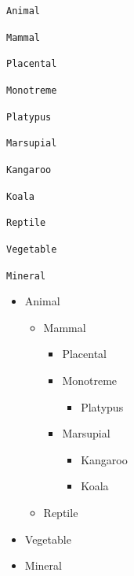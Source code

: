 \begin{code}
\begin{alltt}
  Animal

    Mammal

     Placental

     Monotreme

       Platypus

     Marsupial

      Kangaroo

      Koala

    Reptile

  Vegetable

  Mineral
\end{alltt}
\end{code}
\begin{result}
\begin{itemize}
 \item Animal
 \begin{itemize}
   \item Mammal

   \begin{itemize}
    \item Placental

    \item Monotreme
    \begin{itemize}
      \item Platypus
    \end{itemize}


    \item Marsupial

    \begin{itemize}
     \item Kangaroo

     \item Koala
    \end{itemize}
   \end{itemize}

   \item Reptile
 \end{itemize}

 \item Vegetable

 \item Mineral
\end{itemize}
\end{result}

